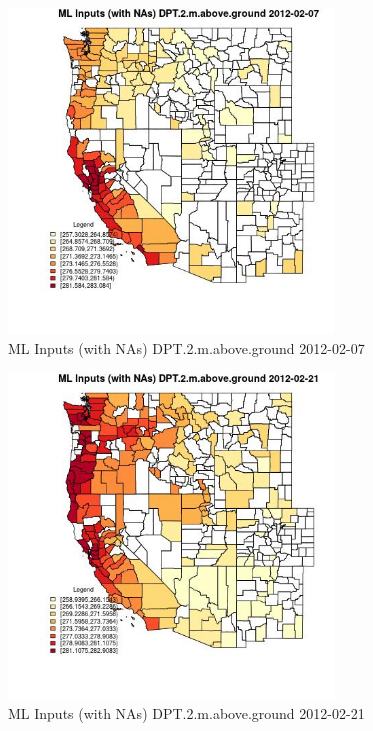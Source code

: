 \clearpage 

\begin{figure} 
\centering  
\includegraphics[width=0.77\textwidth]{Code_Outputs/Report_ML_input_PM25_Step4_part_f_de_duplicated_aveswNAs_CountyDPT2mabovegroundMean2012-02-07.jpg} 
\caption{\label{fig:Report_ML_input_PM25_Step4_part_f_de_duplicated_aveswNAsCountyDPT2mabovegroundMean2012-02-07}ML Inputs (with NAs) DPT.2.m.above.ground 2012-02-07} 
\end{figure} 
 

\begin{figure} 
\centering  
\includegraphics[width=0.77\textwidth]{Code_Outputs/Report_ML_input_PM25_Step4_part_f_de_duplicated_aveswNAs_CountyDPT2mabovegroundMean2012-02-21.jpg} 
\caption{\label{fig:Report_ML_input_PM25_Step4_part_f_de_duplicated_aveswNAsCountyDPT2mabovegroundMean2012-02-21}ML Inputs (with NAs) DPT.2.m.above.ground 2012-02-21} 
\end{figure} 
 

